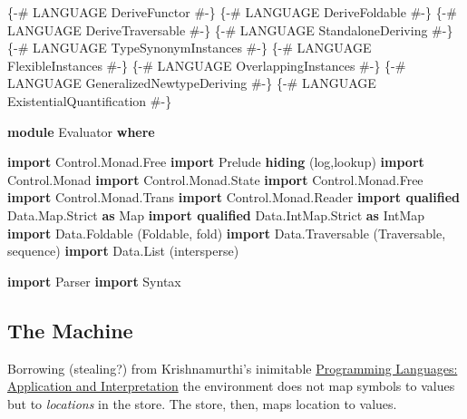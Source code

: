 \documentclass[]{article}
\newenvironment{Shaded}{}{}
\newcommand{\KeywordTok}[1]{\textcolor[rgb]{0.00,0.44,0.13}{\textbf{{#1}}}}
\newcommand{\DataTypeTok}[1]{\textcolor[rgb]{0.56,0.13,0.00}{{#1}}}
\newcommand{\OtherTok}[1]{\textcolor[rgb]{0.00,0.44,0.13}{{#1}}}
\newcommand{\NormalTok}[1]{{#1}}
\begin{document}
\begin{Shaded}
\begin{Highlighting}[]
\OtherTok{\{-# LANGUAGE DeriveFunctor #-\}}
\OtherTok{\{-# LANGUAGE DeriveFoldable #-\}}
\OtherTok{\{-# LANGUAGE DeriveTraversable #-\}}
\OtherTok{\{-# LANGUAGE StandaloneDeriving #-\}}
\OtherTok{\{-# LANGUAGE TypeSynonymInstances #-\}}
\OtherTok{\{-# LANGUAGE FlexibleInstances #-\}}
\OtherTok{\{-# LANGUAGE OverlappingInstances #-\}}
\OtherTok{\{-# LANGUAGE GeneralizedNewtypeDeriving #-\}}
\OtherTok{\{-# LANGUAGE ExistentialQuantification #-\}}

\KeywordTok{module} \DataTypeTok{Evaluator} \KeywordTok{where}

\KeywordTok{import }\DataTypeTok{Control.Monad.Free}
\KeywordTok{import }\DataTypeTok{Prelude} \KeywordTok{hiding} \NormalTok{(log,lookup)}
\KeywordTok{import }\DataTypeTok{Control.Monad}
\KeywordTok{import }\DataTypeTok{Control.Monad.State}
\KeywordTok{import }\DataTypeTok{Control.Monad.Free}
\KeywordTok{import }\DataTypeTok{Control.Monad.Trans}
\KeywordTok{import }\DataTypeTok{Control.Monad.Reader}
\KeywordTok{import qualified} \DataTypeTok{Data.Map.Strict} \KeywordTok{as} \DataTypeTok{Map}
\KeywordTok{import qualified} \DataTypeTok{Data.IntMap.Strict} \KeywordTok{as} \DataTypeTok{IntMap}
\KeywordTok{import }\DataTypeTok{Data.Foldable} \NormalTok{(}\DataTypeTok{Foldable}\NormalTok{, fold)}
\KeywordTok{import }\DataTypeTok{Data.Traversable} \NormalTok{(}\DataTypeTok{Traversable}\NormalTok{, sequence)}
\KeywordTok{import }\DataTypeTok{Data.List} \NormalTok{(intersperse)}

\KeywordTok{import }\DataTypeTok{Parser}
\KeywordTok{import }\DataTypeTok{Syntax}
\end{Highlighting}
\end{Shaded}

\subsection{The Machine}\label{the-machine}

Borrowing (stealing?) from Krishnamurthi's inimitable
\href{http://cs.brown.edu/~sk/Publications/Books/ProgLangs/}{Programming
Languages: Application and Interpretation} the environment does not map
symbols to values but to \emph{locations} in the store. The store, then,
maps location to values.
\end{document}
